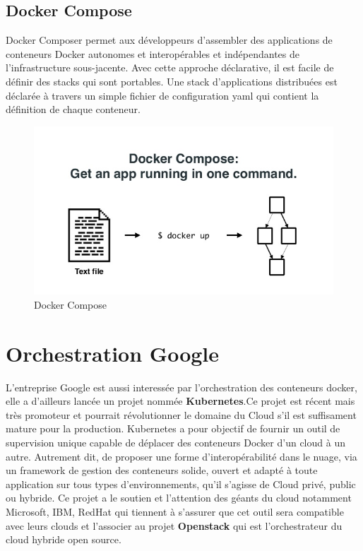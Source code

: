 \begin{onehalfspace}
\subsection{Docker Compose}
  Docker Composer permet aux développeurs d'assembler des applications de conteneurs Docker autonomes et interopérables et indépendantes de l'infrastructure sous-jacente. Avec cette approche déclarative, il est facile de définir des stacks qui sont portables. Une stack d'applications distribuées est déclarée à travers un simple fichier de configuration \acrshort{yaml} qui contient la définition de chaque conteneur.
\begin{figure}[H]
\centering
\includegraphics [scale=0.5]{chapitre3/assets/dockercompose.jpg}
\caption{Docker Compose}
\end{figure}
\section{Orchestration Google}
L'entreprise Google est aussi interessée par l'orchestration des conteneurs docker, elle a d'ailleurs lancée un projet nommée \textbf{Kubernetes}.Ce projet est récent mais très promoteur et pourrait révolutionner le domaine du Cloud s'il est suffisament mature pour la production. Kubernetes a pour objectif de fournir un outil de supervision unique capable de déplacer des conteneurs Docker d'un cloud à un autre. Autrement dit, de proposer une forme d’interopérabilité dans le nuage, via un framework de gestion des conteneurs solide, ouvert et adapté à toute application sur tous types d’environnements, qu’il s’agisse de Cloud privé, public ou hybride. Ce projet a le soutien et l'attention des géants du cloud notamment Microsoft, IBM, RedHat qui tiennent à s'assurer que cet outil sera compatible avec leurs clouds et l'associer au projet \textbf{Openstack} qui est l'orchestrateur du cloud hybride open source.

\end{onehalfspace}
